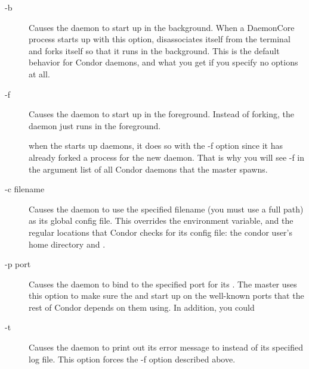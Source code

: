 \begin{description}

\item[-b] Causes the daemon to start up in the background.  When a
  DaemonCore process starts up with this option, disassociates itself
  from the terminal and forks itself so that it runs in the
  background.  This is the default behavior for Condor daemons, and
  what you get if you specify no options at all.

\item[-f] Causes the daemon to start up in the foreground.  Instead of
  forking, the daemon just runs in the foreground.  

  \Note when the  starts up daemons, it does
  so with the -f option since it has already forked a process for the
  new daemon.  That is why you will see -f in the argument list of all
  Condor daemons that the master spawns.

\item[-c filename] Causes the daemon to use the specified filename
  (you must use a full path) as its global config file.  This
  overrides the  environment variable, and the
  regular locations that Condor checks for its config file: the condor
  user's home directory and .  

\item[-p port] Causes the daemon to bind to the specified port for its
  .  The master uses this option to make sure the
   and  start up on the
  well-known ports that the rest of Condor depends on them using.  In
  addition, you could

\item[-t] Causes the daemon to print out its error message to
   instead of its specified log file.  This option forces
  the -f option described above.

\end{description}

